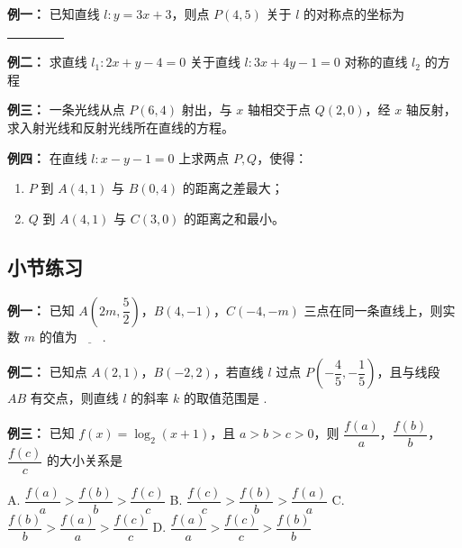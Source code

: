 \documentclass{article}
\begin{document}
\vspace{2\baselineskip}

\noindent\textbf{例一： }已知直线 \(l: y = 3x + 3\)，则点 \(P(4, 5)\) 关于 \(l\) 的对称点的坐标为 \underline{\ \ \ \ \ \ \ \ \ }
\vspace{2\baselineskip}

\noindent\textbf{例二： }求直线 \(l_1: 2x + y - 4 = 0\) 关于直线 \(l: 3x + 4y - 1 = 0\) 对称的直线 \(l_2\) 的方程
\vspace{2\baselineskip}

\noindent\textbf{例三： }一条光线从点 \(P(6, 4)\) 射出，与 \(x\) 轴相交于点 \(Q(2, 0)\)，经 \(x\) 轴反射，求入射光线和反射光线所在直线的方程。
\vspace{2\baselineskip}

\noindent\textbf{例四： }在直线 \(l: x - y - 1 = 0\) 上求两点 \(P, Q\)，使得：
\begin{enumerate}
    \item \(P\) 到 \(A(4, 1)\) 与 \(B(0, 4)\) 的距离之差最大；
    \item \(Q\) 到 \(A(4, 1)\) 与 \(C(3, 0)\) 的距离之和最小。
\end{enumerate}
\newpage

\begin{center}
    \subsection*{小节练习}
\end{center}

\noindent\textbf{例一： }已知 \(A\left(2m,\dfrac{5}{2}\right)\)，\(B(4,-1)\)，\(C(-4,-m)\) 三点在同一条直线上，则实数 \(m\) 的值为\(\underline{\qquad}\).
\vspace{2\baselineskip}

\noindent\textbf{例二： }已知点 \(A(2,1)\)，\(B(-2,2)\)，若直线 \(l\) 过点 \(P\left(-\dfrac{4}{5},-\dfrac{1}{5}\right)\)，且与线段 \(AB\) 有交点，则直线 \(l\) 的斜率 \(k\) 的取值范围是 \underline{\hspace{4cm}}.
\vspace{2\baselineskip}

\noindent\textbf{例三： } 已知 \(f(x) = \log_2(x+1)\)，且 \(a > b > c > 0\)，则 \(\dfrac{f(a)}{a}\)，\(\dfrac{f(b)}{b}\)，\(\dfrac{f(c)}{c}\) 的大小关系是

\vspace{0.5em}
\noindent
A. \(\dfrac{f(a)}{a} > \dfrac{f(b)}{b} > \dfrac{f(c)}{c}\) \quad
B. \(\dfrac{f(c)}{c} > \dfrac{f(b)}{b} > \dfrac{f(a)}{a}\) \quad
C. \(\dfrac{f(b)}{b} > \dfrac{f(a)}{a} > \dfrac{f(c)}{c}\) \quad
D. \(\dfrac{f(a)}{a} > \dfrac{f(c)}{c} > \dfrac{f(b)}{b}\)
\vspace{2\baselineskip}
\end{document}

